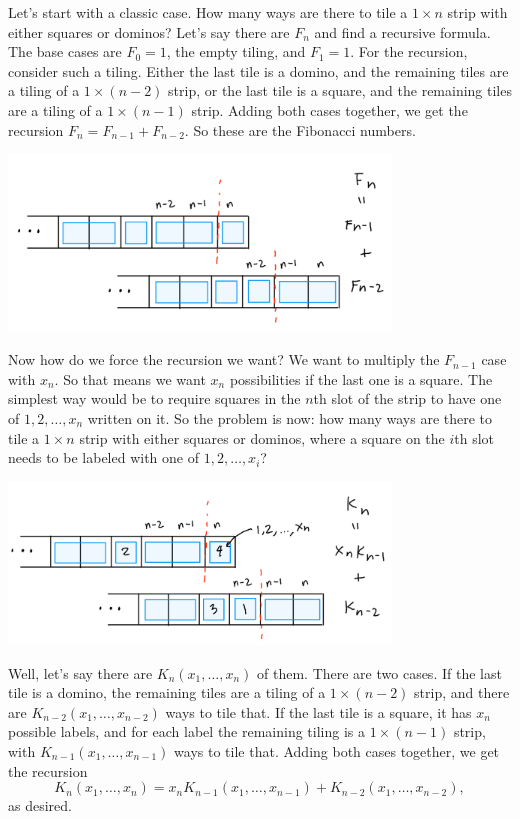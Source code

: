 \documentclass[11pt,paper=letter]{scrartcl}
\begin{document}
Let's start with a classic case. How many ways are there to tile a $1 \times n$ strip with either squares or dominos? Let's say there are $F_n$ and find a recursive formula. The base cases are $F_0 = 1$, the empty tiling, and $F_1 = 1$. For the recursion, consider such a tiling. Either the last tile is a domino, and the remaining tiles are a tiling of a $1 \times (n - 2)$ strip, or the last tile is a square, and the remaining tiles are a tiling of a $1 \times (n - 1)$ strip. Adding both cases together, we get the recursion $F_n = F_{n-1} + F_{n-2}$. So these are the Fibonacci numbers.
\begin{center}
\vspace{-1em}
\includegraphics[width=4in]{1.png}
\end{center}
Now how do we force the recursion we want? We want to multiply the $F_{n-1}$ case with $x_n$. So that means we want $x_n$ possibilities if the last one is a square. The simplest way would be to require squares in the $n$th slot of the strip to have one of $1, 2, \ldots, x_n$ written on it. So the problem is now: how many ways are there to tile a $1 \times n$ strip with either squares or dominos, where a square on the $i$th slot needs to be labeled with one of $1, 2, \ldots, x_i$?

\begin{center}
\vspace{-0.5em}
\includegraphics[width=4in]{2.png}
\end{center}

Well, let's say there are $K_n(x_1, \ldots, x_n)$ of them. There are two cases. If the last tile is a domino, the remaining tiles are a tiling of a $1 \times (n - 2)$ strip, and there are $K_{n-2}(x_1, \ldots, x_{n-2})$ ways to tile that. If the last tile is a square, it has $x_n$ possible labels, and for each label the remaining tiling is a $1 \times (n-1)$ strip, with $K_{n-1}(x_1, \ldots, x_{n-1})$ ways to tile that. Adding both cases together, we get the recursion \[
  K_n(x_1, \ldots, x_n) = x_n K_{n-1}(x_1, \ldots, x_{n-1}) + K_{n-2}(x_1, \ldots, x_{n-2}),
\]
as desired.
\end{document}
